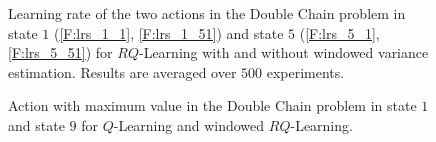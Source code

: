 \begin{figure}[t]
\begin{minipage}{\textwidth}
\end{minipage}
\caption[Learning rate adaptation in double chain problem]{Learning rate of the two actions in the Double Chain problem in state $1$ (\ref{F:lrs_1_1}, \ref{F:lrs_1_51}) and state $5$ (\ref{F:lrs_5_1}, \ref{F:lrs_5_51}) for $RQ$-Learning with and without windowed variance estimation. Results are averaged over $500$ experiments.}
  \label{F:double_chain_lr}
\end{figure}
\begin{figure}[t]
\begin{minipage}{\textwidth}
\centering
\end{minipage}
\caption[Policy in double chain problem]{Action with maximum value in the Double Chain problem in state $1$ and state $9$ for $Q$-Learning and windowed $RQ$-Learning.}
  \label{F:max_a}
\end{figure}
